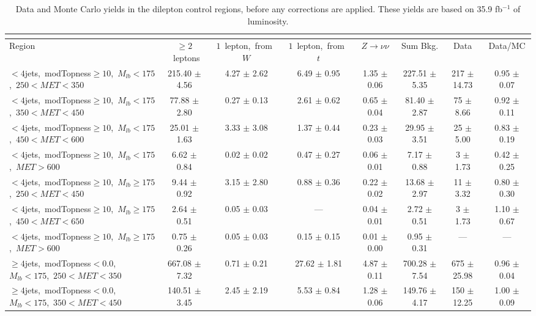 \begin{table}
\centering
{\scriptsize
\caption{Data and Monte Carlo yields in the dilepton control regions,
  before any corrections are applied. These yields are based on 35.9
  fb$^{-1}$ of luminosity.}
\label{tab:stop:lostlep:cryields}
\begin{tabular}{|l|c c c c c|c|c|}
\multicolumn{8}{c}{}\\* \hline
Region  & $\ge2$~leptons & $1$~lepton,~from~$W$ & $1$~lepton,~from~$t$ & $Z\rightarrow\nu\nu$ & Sum Bkg. & Data & Data/MC \\*
\hline \hline
$<4$jets,~modTopness$\ge10$,~$M_{lb}<175$,~$250<MET<350$  & 215.40 $\pm$ 4.56  & 4.27 $\pm$ 2.62  & 6.49 $\pm$ 0.95  & 1.35 $\pm$ 0.06  & 227.51 $\pm$ 5.35  & 217 $\pm$ 14.73  & 0.95 $\pm$ 0.07 \\*
$<4$jets,~modTopness$\ge10$,~$M_{lb}<175$,~$350<MET<450$  & 77.88 $\pm$ 2.80  & 0.27 $\pm$ 0.13  & 2.61 $\pm$ 0.62  & 0.65 $\pm$ 0.04  & 81.40 $\pm$ 2.87  & 75 $\pm$ 8.66  & 0.92 $\pm$ 0.11 \\*
$<4$jets,~modTopness$\ge10$,~$M_{lb}<175$,~$450<MET<600$  & 25.01 $\pm$ 1.63  & 3.33 $\pm$ 3.08  & 1.37 $\pm$ 0.44  & 0.23 $\pm$ 0.03  & 29.95 $\pm$ 3.51  & 25 $\pm$ 5.00  & 0.83 $\pm$ 0.19 \\*
$<4$jets,~modTopness$\ge10$,~$M_{lb}<175$,~$MET>600$  & 6.62 $\pm$ 0.84  & 0.02 $\pm$ 0.02  & 0.47 $\pm$ 0.27  & 0.06 $\pm$ 0.01  & 7.17 $\pm$ 0.88  & 3 $\pm$ 1.73  & 0.42 $\pm$ 0.25 \\*
\hline
$<4$jets,~modTopness$\ge10$,~$M_{lb}\ge175$,~$250<MET<450$  & 9.44 $\pm$ 0.92  & 3.15 $\pm$ 2.80  & 0.88 $\pm$ 0.36  & 0.22 $\pm$ 0.02  & 13.68 $\pm$ 2.97  & 11 $\pm$ 3.32  & 0.80 $\pm$ 0.30 \\*
$<4$jets,~modTopness$\ge10$,~$M_{lb}\ge175$,~$450<MET<650$  & 2.64 $\pm$ 0.51  & 0.05 $\pm$ 0.03  & ---  & 0.04 $\pm$ 0.01  & 2.72 $\pm$ 0.51  & 3 $\pm$ 1.73  & 1.10 $\pm$ 0.67 \\*
$<4$jets,~modTopness$\ge10$,~$M_{lb}\ge175$,~$MET>600$  & 0.75 $\pm$ 0.26  & 0.05 $\pm$ 0.03  & 0.15 $\pm$ 0.15  & 0.01 $\pm$ 0.00  & 0.95 $\pm$ 0.31  & --- & --- \\*
\hline
$\ge4$jets,~modTopness$<0.0$,~$M_{lb}<175$,~$250<MET<350$  & 667.08 $\pm$ 7.32  & 0.71 $\pm$ 0.21  & 27.62 $\pm$ 1.81  & 4.87 $\pm$ 0.11  & 700.28 $\pm$ 7.54  & 675 $\pm$ 25.98  & 0.96 $\pm$ 0.04 \\*
$\ge4$jets,~modTopness$<0.0$,~$M_{lb}<175$,~$350<MET<450$  & 140.51 $\pm$ 3.45  & 2.45 $\pm$ 2.19  & 5.53 $\pm$ 0.84  & 1.28 $\pm$ 0.06  & 149.76 $\pm$ 4.17  & 150 $\pm$ 12.25  & 1.00 $\pm$ 0.09 \\*

\end{tabular}}
\end{table}

